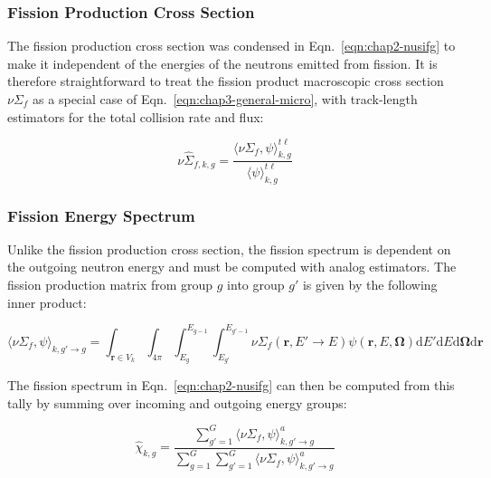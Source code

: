 \subsubsection{Fission Production Cross Section}
\label{subsubsec:chap3-tally-types-fiss-prod}

The fission production cross section was condensed in Eqn.~\ref{eqn:chap2-nusifg} to make it independent of the energies of the neutrons emitted from fission. It is therefore straightforward to treat the fission product macroscopic cross section $\nu\Sigma_{f}$ as a special case of Eqn.~\ref{eqn:chap3-general-micro}, with track-length estimators for the total collision rate and flux:

\begin{equation}
\label{eqn:chap3-nu-fiss-macro}
\nu\hat{\Sigma}_{f,k,g} = \frac{\langle \nu\Sigma_{f}, \psi \rangle_{k,g}^{t\ell}}{\langle \psi \rangle_{k,g}^{t\ell}}
\end{equation}


\subsubsection{Fission Energy Spectrum}
\label{subsubsec:chap3-tally-types-chi}

Unlike the fission production cross section, the fission spectrum is dependent on the outgoing neutron energy and must be computed with analog estimators. The fission production matrix from group $g$ into group $g'$ is given by the following inner product:

\begin{equation}
\label{eqn:chap3-nu-fiss-energies}
\langle \nu\Sigma_{f}, \psi \rangle_{k,g'\rightarrow g} = \int_{\mathbf{r} \in V_{k}} \int_{4\pi} \int_{E_{g}}^{E_{g-1}} \int_{E_{g'}}^{E_{g'-1}} \nu\Sigma_{f}(\mathbf{r},E'\rightarrow E)\psi(\mathbf{r},E,\mathbf{\Omega}) \mathrm{d}E'\mathrm{d}E\mathrm{d}\mathbf{\Omega}\mathrm{d}\mathbf{r}
\end{equation}

\noindent The fission spectrum in Eqn.~\ref{eqn:chap2-nusifg} can then be computed from this tally by summing over incoming and outgoing energy groups:

\begin{equation}
\label{eqn:chap3-chi}
\hat{\chi}_{k,g} = \frac{\displaystyle\sum\limits_{g'=1}^{G} \langle \nu\Sigma_{f}, \psi \rangle_{k,g'\rightarrow g}^{a}}{\displaystyle\sum\limits_{g=1}^{G} \displaystyle\sum\limits_{g'=1}^{G} \langle \nu\Sigma_{f}, \psi \rangle_{k,g'\rightarrow g}^{a}}
\end{equation}

